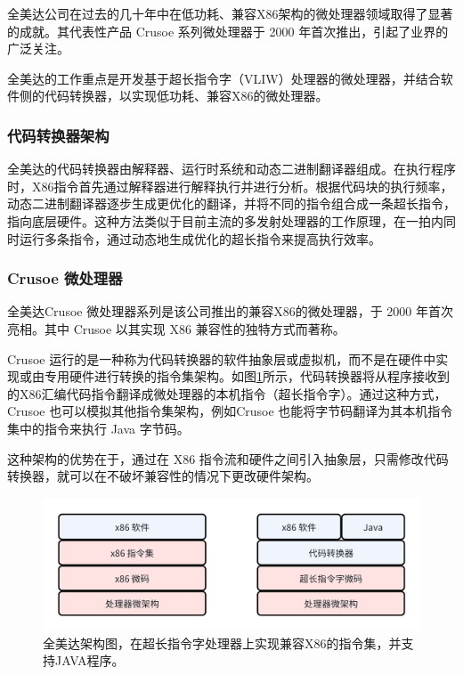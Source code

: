 \documentclass{Style/ucasproposal}%
\begin{document}
全美达公司在过去的几十年中在低功耗、兼容X86架构的微处理器领域取得了显著的成就。其代表性产品 Crusoe 系列微处理器于 2000 年首次推出，引起了业界的广泛关注。

全美达的工作重点是开发基于超长指令字（VLIW）处理器的微处理器，并结合软件侧的代码转换器，以实现低功耗、兼容X86的微处理器。

\subsubsection{代码转换器架构}

全美达的代码转换器\cite{dehnertTransmetaCodeMorphing2003}由解释器、运行时系统和动态二进制翻译器组成。在执行程序时，X86指令首先通过解释器进行解释执行并进行分析。根据代码块的执行频率，动态二进制翻译器逐步生成更优化的翻译，并将不同的指令组合成一条超长指令，指向底层硬件。这种方法类似于目前主流的多发射处理器的工作原理，在一拍内同时运行多条指令，通过动态地生成优化的超长指令来提高执行效率。

\subsubsection{Crusoe 微处理器}

全美达Crusoe 微处理器系列是该公司推出的兼容X86的微处理器，于 2000 年首次亮相。其中 Crusoe 以其实现 X86 兼容性的独特方式而著称。

Crusoe 运行的是一种称为代码转换器的软件抽象层或虚拟机，而不是在硬件中实现或由专用硬件进行转换的指令集架构。如图\ref{img:transmeta_arch}所示，代码转换器将从程序接收到的X86汇编代码指令翻译成微处理器的本机指令（超长指令字）。通过这种方式，Crusoe 也可以模拟其他指令集架构，例如Crusoe 也能将字节码翻译为其本机指令集中的指令来执行 Java 字节码。

这种架构的优势在于，通过在 X86 指令流和硬件之间引入抽象层，只需修改代码转换器，就可以在不破坏兼容性的情况下更改硬件架构。

\begin{figure}[h]
    \centering
    \includegraphics[width=0.8\linewidth]{./feishuImage/transmeta_arch.png}
    \caption{全美达架构图，在超长指令字处理器上实现兼容X86的指令集，并支持JAVA程序。}
    \label{img:transmeta_arch}
  \end{figure}
\end{document}
